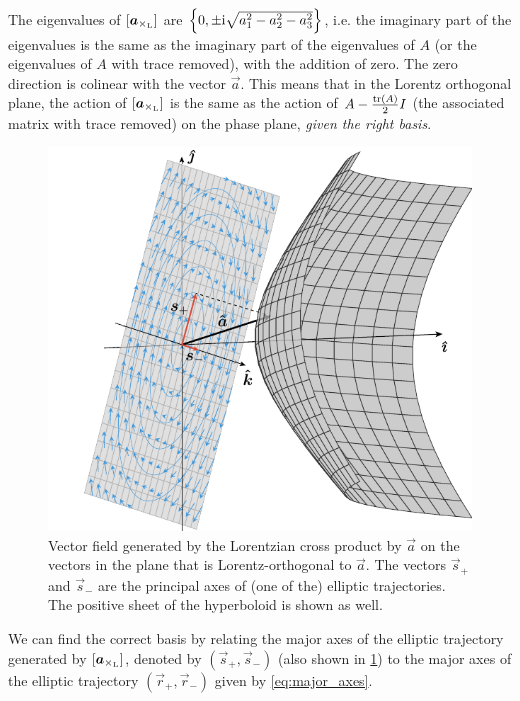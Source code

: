The eigenvalues of \( [\vec{a}_{\lorcrossp{}{}}] \)  are \(\qty{0, \pm \ensuremath{\mathrm{i}}\sqrt{a_1^2 - a_2^2 - a_3^2}}\), i.e. the imaginary part of the eigenvalues is the same as the imaginary part of the eigenvalues of \(A\) (or the eigenvalues of \(A\) with trace removed), with the addition of zero. The zero direction is colinear with the vector \(\vec{a}\).  This means that in the Lorentz orthogonal plane, the action of \( [\vec{a}_{\lorcrossp{}{}}] \) is the same as the action of \(A - \frac{\tr(A)}{2}I\) (the associated matrix with trace removed) on the phase plane, \emph{given the right basis}.

\begin{figure}[ht]
    \centering
    \includegraphics[scale=1]{media/other/cross_product.pdf}
    \caption{Vector field generated by the Lorentzian cross product by \(\vec{a}\) on the vectors in the plane that is Lorentz-orthogonal to \(\vec{a}\). The vectors $\vec{s}_+$ and $\vec{s}_-$ are the principal axes of (one of the) elliptic trajectories. The positive sheet of the hyperboloid is shown as well.}
    \label{fig:cross_product}
\end{figure}

We can find the correct basis by relating the major axes of the elliptic trajectory generated by \( [\vec{a}_{\lorcrossp{}{}}] \), denoted by \((\vec{s}_+, \vec{s}_-)\) (also shown in \cref{fig:cross_product})
to the major axes of the elliptic trajectory \((\vec{r}_+, \vec{r}_-)\) given by \cref{eq:major_axes}. 


